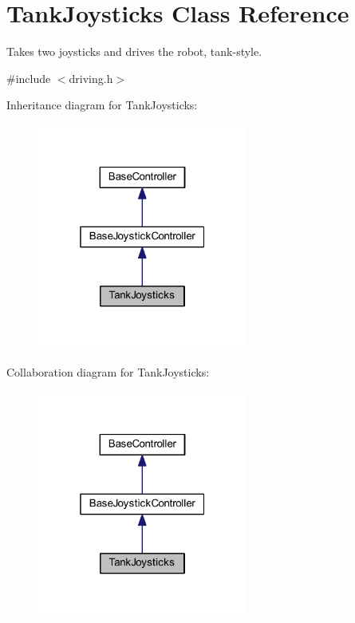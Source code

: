 \hypertarget{class_tank_joysticks}{\section{\-Tank\-Joysticks \-Class \-Reference}
\label{class_tank_joysticks}
}


\-Takes two joysticks and drives the robot, tank-\/style.  




{\ttfamily \#include $<$driving.\-h$>$}



\-Inheritance diagram for \-Tank\-Joysticks\-:\nopagebreak
\begin{figure}[H]
\begin{center}
\leavevmode
\includegraphics[width=196pt]{class_tank_joysticks__inherit__graph}
\end{center}
\end{figure}


\-Collaboration diagram for \-Tank\-Joysticks\-:\nopagebreak
\begin{figure}[H]
\begin{center}
\leavevmode
\includegraphics[width=196pt]{class_tank_joysticks__coll__graph}
\end{center}
\end{figure}
